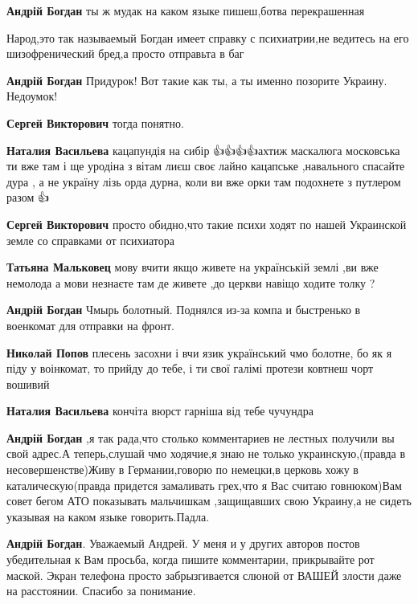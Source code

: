 \begin{itemize}
\begin{itemize}
\textbf{Андрій Богдан} ты ж мудак на каком языке пишеш,ботва перекрашенная

Народ,это так называемый Богдан имеет справку с психиатрии,не ведитесь на его
шизофренический бред,а просто отправьта в баг

\textbf{Андрій Богдан} Придурок! Вот такие как ты, а ты именно позорите Украину. Недоумок!

\textbf{Сергей Викторович} тогда понятно.

\textbf{Наталия Васильева} кацапундія на сибір \Laughey[1.0]\Laughey[1.0]\Laughey[1.0]👍👍👍👍ахтиж маскалюга
московська ти вже там і ще уродіна з вітам лиєш своє лайно кацапське
,навального спасайте дура , а не україну лізь орда дурна, коли ви вже орки там
подохнете з путлером разом \Laughey[1.0]\Laughey[1.0]\Laughey[1.0]👍

\textbf{Сергей Викторович} просто обидно,что такие психи ходят по нашей Украинской земле со справками от психиатора

\textbf{Татьяна Мальковец} мову вчити якщо живете на українській землі ,ви вже немолода а мови незнаєте там де живете ,до церкви навіщо ходите толку ?

\textbf{Андрій Богдан} Чмырь болотный. Поднялся из-за компа и быстренько в военкомат для отправки на фронт.

\textbf{Николай Попов} плесень засохни і вчи язик український чмо болотне, бо як я піду у воінкомат, то прийду до тебе, і ти свої галімі протези ковтнеш чорт вошивий \Laughey[1.0]\Laughey[1.0]\Laughey[1.0]\Laughey[1.0]\Laughey[1.0]

\textbf{Наталия Васильева} кончіта вюрст гарніша від тебе чучундра \Laughey[1.0]\Laughey[1.0]\Laughey[1.0]\Laughey[1.0]

\textbf{Андрій Богдан} ,я так рада,что столько комментариев не лестных получили вы свой адрес.А теперь,слушай чмо ходячие,я знаю не только украинскую,(правда в несовершенстве)Живу в Германии,говорю по немецки,в церковь хожу в каталическую(правда придется замаливать грех,что я Вас считаю говнюком)Вам совет бегом АТО показывать мальчишкам ,защищавших свою Украину,а не сидеть указывая на каком языке говорить.Падла.

\textbf{Андрій Богдан}. Уважаемый Андрей.
У меня и у других авторов постов убедительная к Вам просьба, когда пишите комментарии, прикрывайте рот маской.
Экран телефона просто забрызгивается слюной от ВАШЕЙ злости даже на расстоянии.
Спасибо за понимание.


\end{itemize}
\end{itemize}
